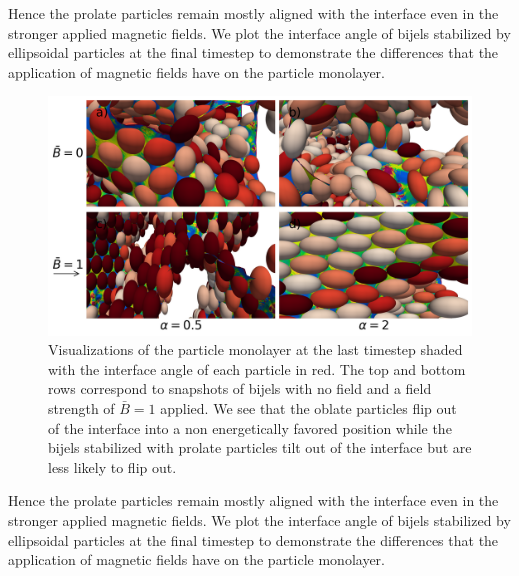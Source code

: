 Hence the prolate particles remain mostly aligned with the interface
even in the stronger applied magnetic fields. We plot the interface angle of bijels
stabilized by ellipsoidal particles at the final timestep to demonstrate the differences
that the application of magnetic fields have on the particle monolayer.

\begin{figure}
    \centering
    \includegraphics[scale = 0.4]{figures/results/paper1/psi_concat.png}
    \caption{Visualizations of the particle monolayer at the last timestep shaded with the interface angle of each particle in red. The top and bottom
             rows correspond to snapshots of bijels with no field and a field strength of $\bar{B} = 1$ applied. We see that the oblate particles flip
             out of the interface into a non energetically favored position while the bijels stabilized with prolate particles tilt out of the interface
             but are less likely to flip out.}
    \label{fig:psi_viz_ss}
\end{figure}

Hence the prolate particles remain mostly aligned with the interface
even in the stronger applied magnetic fields. We plot the interface angle of bijels
stabilized by ellipsoidal particles at the final timestep to demonstrate the differences
that the application of magnetic fields have on the particle monolayer.

